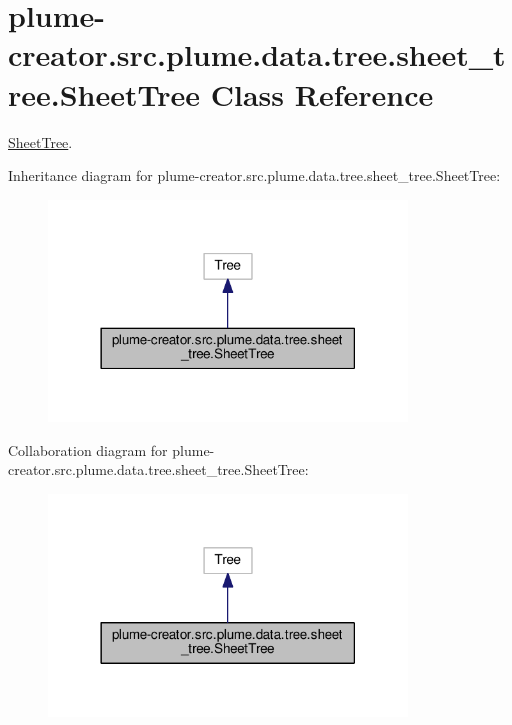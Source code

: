 \hypertarget{classplume-creator_1_1src_1_1plume_1_1data_1_1tree_1_1sheet__tree_1_1_sheet_tree}{}\section{plume-\/creator.src.\+plume.\+data.\+tree.\+sheet\+\_\+tree.\+Sheet\+Tree Class Reference}
\label{classplume-creator_1_1src_1_1plume_1_1data_1_1tree_1_1sheet__tree_1_1_sheet_tree}


\hyperlink{classplume-creator_1_1src_1_1plume_1_1data_1_1tree_1_1sheet__tree_1_1_sheet_tree}{Sheet\+Tree}.  




Inheritance diagram for plume-\/creator.src.\+plume.\+data.\+tree.\+sheet\+\_\+tree.\+Sheet\+Tree\+:\nopagebreak
\begin{figure}[H]
\begin{center}
\leavevmode
\includegraphics[width=270pt]{classplume-creator_1_1src_1_1plume_1_1data_1_1tree_1_1sheet__tree_1_1_sheet_tree__inherit__graph}
\end{center}
\end{figure}


Collaboration diagram for plume-\/creator.src.\+plume.\+data.\+tree.\+sheet\+\_\+tree.\+Sheet\+Tree\+:\nopagebreak
\begin{figure}[H]
\begin{center}
\leavevmode
\includegraphics[width=270pt]{classplume-creator_1_1src_1_1plume_1_1data_1_1tree_1_1sheet__tree_1_1_sheet_tree__coll__graph}
\end{center}
\end{figure}
